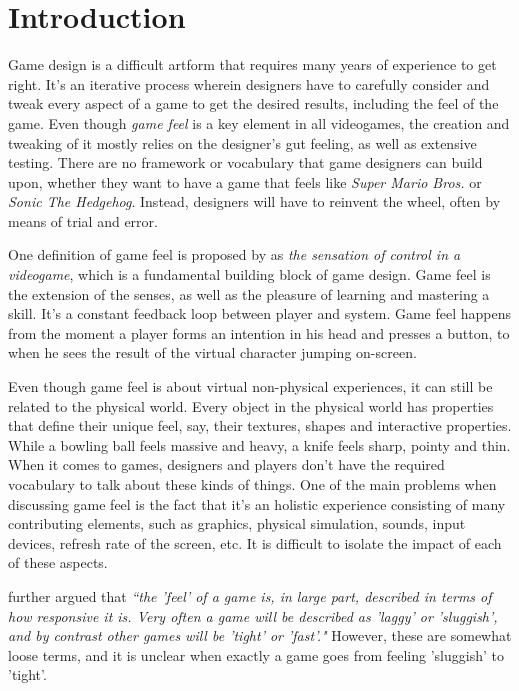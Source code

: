 \section{Introduction}
Game design is a difficult artform that requires many years of experience to get right. It's an iterative process wherein designers have to carefully consider and tweak every aspect of a game to get the desired results, including the feel of the game. Even though \textit{game feel} is a key element in all videogames, the creation and tweaking of it mostly relies on the designer's gut feeling, as well as extensive testing. There are no framework or vocabulary that game designers can build upon, whether they want to have a game that feels like \textit{Super Mario Bros.} or \textit{Sonic The Hedgehog}. Instead, designers will have to reinvent the wheel, often by means of trial and error.

One definition of game feel is proposed by \cite{swink} as \textit{the sensation of control in a videogame}, which is a fundamental building block of game design. Game feel is the extension of the senses, as well as the pleasure of learning and mastering a skill. It's a constant feedback loop between player and system. Game feel happens from the moment a player forms an intention in his head and presses a button, to when he sees the result of the virtual character jumping on-screen.

Even though game feel is about virtual non-physical experiences, it can still be related to the physical world. Every object in the physical world has properties that define their unique feel, say, their textures, shapes and interactive properties. While a bowling ball feels massive and heavy, a knife feels sharp, pointy and thin. When it comes to games, designers and players don't have the required vocabulary to talk about these kinds of things. One of the main problems when discussing game feel is the fact that it's an holistic experience consisting of many contributing elements, such as graphics, physical simulation, sounds, input devices, refresh rate of the screen, etc. It is difficult to isolate the impact of each of these aspects.

\cite{measure_lag} further argued that \textit{``the 'feel' of a game is, in large part, described in terms of how responsive it is. Very often a game will be described as 'laggy' or 'sluggish', and by contrast other games will be 'tight' or 'fast'."} However, these are somewhat loose terms, and it is unclear when exactly a game goes from feeling 'sluggish' to 'tight'.

